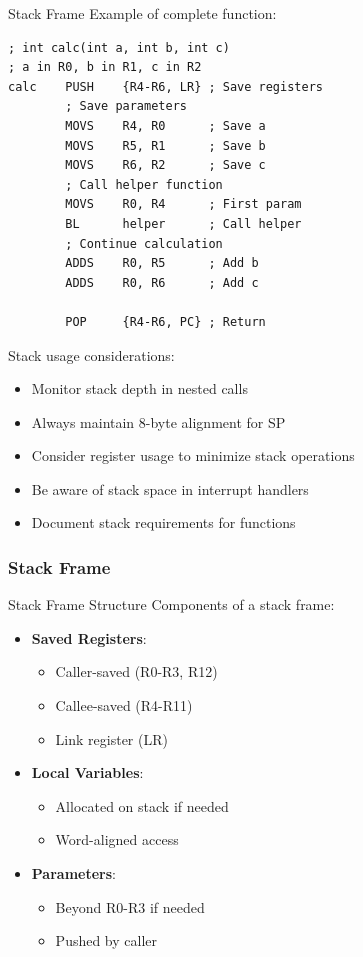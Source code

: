 \begin{example2}{Stack Frame}
Example of complete function:
\begin{lstlisting}[language=armasm, style=basesmol]
; int calc(int a, int b, int c)
; a in R0, b in R1, c in R2
calc    PUSH    {R4-R6, LR} ; Save registers
        ; Save parameters
        MOVS    R4, R0      ; Save a
        MOVS    R5, R1      ; Save b
        MOVS    R6, R2      ; Save c
        ; Call helper function
        MOVS    R0, R4      ; First param
        BL      helper      ; Call helper
        ; Continue calculation
        ADDS    R0, R5      ; Add b
        ADDS    R0, R6      ; Add c
        
        POP     {R4-R6, PC} ; Return
\end{lstlisting}
\end{example2}

\begin{remark}
Stack usage considerations:
\begin{itemize}
  \item Monitor stack depth in nested calls
  \item Always maintain 8-byte alignment for SP
  \item Consider register usage to minimize stack operations
  \item Be aware of stack space in interrupt handlers
  \item Document stack requirements for functions
\end{itemize}
\end{remark}

\columnbreak

\subsubsection{Stack Frame}

\begin{definition}{Stack Frame Structure}
Components of a stack frame:
\begin{itemize}
  \item \textbf{Saved Registers}:
    \begin{itemize}
      \item Caller-saved (R0-R3, R12)
      \item Callee-saved (R4-R11)
      \item Link register (LR)
    \end{itemize}
  \item \textbf{Local Variables}:
    \begin{itemize}
      \item Allocated on stack if needed
      \item Word-aligned access
    \end{itemize}
  \item \textbf{Parameters}:
    \begin{itemize}
      \item Beyond R0-R3 if needed
      \item Pushed by caller
    \end{itemize}
\end{itemize}

\end{definition}


